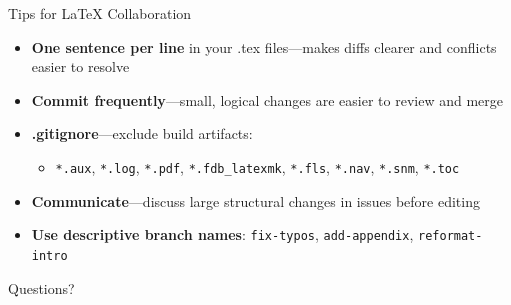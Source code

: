 \documentclass[aspectratio=169]{beamer}
\begin{document}
\begin{frame}{Tips for LaTeX Collaboration}
\begin{itemize}
    \item \textbf{One sentence per line} in your .tex files—makes diffs clearer and conflicts easier to resolve
    \item \textbf{Commit frequently}—small, logical changes are easier to review and merge
    \item \textbf{.gitignore}—exclude build artifacts:
    \begin{itemize}
        \item \texttt{*.aux}, \texttt{*.log}, \texttt{*.pdf}, \texttt{*.fdb\_latexmk}, \texttt{*.fls}, \texttt{*.nav}, \texttt{*.snm}, \texttt{*.toc}
    \end{itemize}
    \item \textbf{Communicate}—discuss large structural changes in issues before editing
    \item \textbf{Use descriptive branch names}: \texttt{fix-typos}, \texttt{add-appendix}, \texttt{reformat-intro}
\end{itemize}
\end{frame}

\begin{frame}
    \begin{center}
        \Huge Questions?
    \end{center}
\end{frame}
\end{document}
